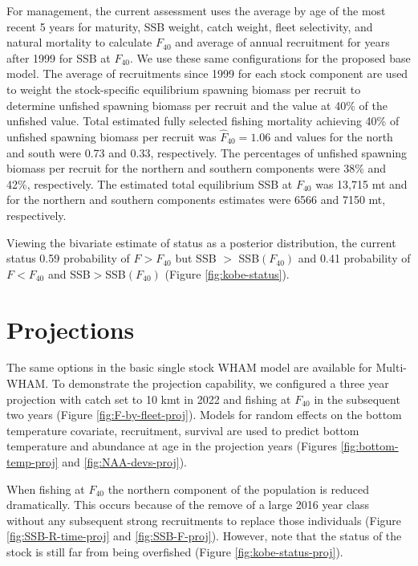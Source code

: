 \documentclass[
]{article}
\begin{document}
For management, the current assessment uses the average by age of the most recent 5 years for maturity, SSB weight, catch weight, fleet selectivity, and natural mortality to calculate \(F_{40}\) and average of annual recruitment for years after 1999 for SSB at \(F_{40}\). We use these same configurations for the proposed base model. The average of recruitments since 1999 for each stock component are used to weight the stock-specific equilibrium spawning biomass per recruit to determine unfished spawning biomass per recruit and the value at 40\% of the unfished value. Total estimated fully selected fishing mortality achieving 40\% of unfished spawning biomass per recruit was \(\widehat F_{40}= 1.06\) and values for the north and south were 0.73 and 0.33, respectively. The percentages of unfished spawning biomass per recruit for the northern and southern components were 38\% and 42\%, respectively. The estimated total equilibrium SSB at \(F_{40}\) was 13,715 mt and for the northern and southern components estimates were 6566 and 7150 mt, respectively.

Viewing the bivariate estimate of status as a posterior distribution, the current status 0.59 probability of \(F>F_{40}\) but SSB \(>\) SSB\((F_{40})\) and 0.41 probability of \(F<F_{40}\) and SSB\(>\)SSB\((F_{40})\) (Figure \ref{fig:kobe-status}).

\hypertarget{projections}{%
\section{Projections}\label{projections}}

The same options in the basic single stock WHAM model are available for Multi-WHAM. To demonstrate the projection capability, we configured a three year projection with catch set to 10 kmt in 2022 and fishing at \(F_{40}\) in the subsequent two years (Figure \ref{fig:F-by-fleet-proj}). Models for random effects on the bottom temperature covariate, recruitment, survival are used to predict bottom temperature and abundance at age in the projection years (Figures \ref{fig:bottom-temp-proj} and \ref{fig:NAA-devs-proj}).

When fishing at \(F_{40}\) the northern component of the population is reduced dramatically. This occurs because of the remove of a large 2016 year class without any subsequent strong recruitments to replace those individuals (Figure \ref{fig:SSB-R-time-proj} and \ref{fig:SSB-F-proj}). However, note that the status of the stock is still far from being overfished (Figure \ref{fig:kobe-status-proj}).
\end{document}
